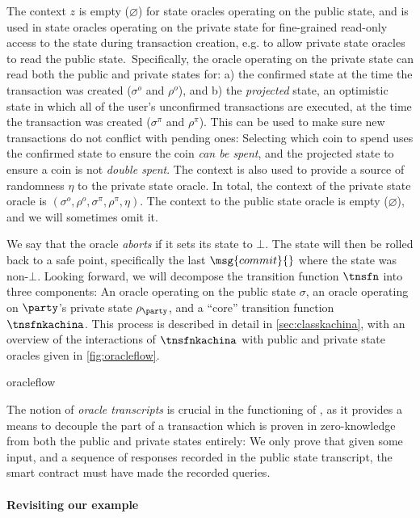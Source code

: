 The context $z$ is empty ($\varnothing$) for state oracles operating on the public state, and is used in
state oracles operating on the private state for fine-grained read-only access
to the state during transaction creation, e.g. to allow private state oracles to read the public
state.\ 
Specifically, the oracle operating on the private state can read both the public
and private states for: a) the confirmed state at the time the transaction was
created ($\sigma^o$ and $\rho^o$), and b) the \emph{projected} state, an
optimistic state in which all of the user's unconfirmed transactions are
executed, at the time the transaction was created ($\sigma^\pi$ and $\rho^\pi$).
This can be used to make sure new transactions do not conflict with pending ones:
Selecting which coin to spend uses the confirmed state to ensure the coin
\emph{can be spent}, and the projected state to ensure a coin is not
\emph{double spent}. The context is also used to provide a source of randomness
$\eta$ to the private state oracle. In total, the context of the private state
oracle is $(\sigma^o, \rho^o, \sigma^\pi, \rho^\pi, \eta)$. The context to the
public state oracle is empty ($\varnothing$), and we will sometimes omit it.

We say that the oracle \emph{aborts} if it sets its state to $\bot$. The
  state will then be rolled back to a safe point, specifically the last
  $\msg{commit}{}$ where the state was non-$\bot$. Looking forward, we will decompose the
transition function $\tnsfn$ into three components: An oracle operating on the
public state $\sigma$, an oracle operating on $\party$'s private state
$\rho_\party$, and a ``core'' transition function $\tnsfnkachina$. This process
is described in detail in \autoref{sec:classkachina}, with an overview of the
interactions of $\tnsfnkachina$ with public and private state oracles given
in \autoref{fig:oracleflow}.

{oracleflow}

The notion of \emph{oracle transcripts} is crucial in the functioning
of \kachina, as it provides a means to decouple the part of a transaction which
is proven in zero-knowledge from both the public and private states entirely: We
only prove that given some input, and a sequence of responses recorded in the
public state transcript, the smart contract must have made the recorded queries.

\paragraph{Revisiting our example}


